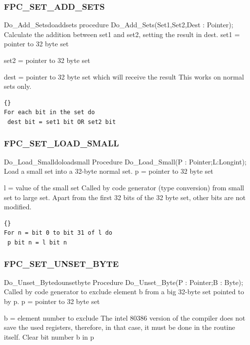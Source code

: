 \documentclass [a4paper,12pt]{article}
\begin{document}
\subsubsection{FPC{\_}SET{\_}ADD{\_}SETS}
\label{subsubsec:mylabel94}

\begin{procedurel}{Do{\_}Add{\_}Sets}{doaddsets}
\Declaration
procedure Do{\_}Add{\_}Sets(Set1,Set2,Dest : Pointer);
\Description
Calculate the addition between \textsf{set1} and \textsf{set2}, setting the
result in \textsf{dest}.
\Parameters
set1 = pointer to 32 byte set \par
set2 = pointer to 32 byte set \par
dest = pointer to 32 byte set which will receive the result
\Notes
This works on normal sets only.
\Algorithm
\begin{lstlisting}{}
For each bit in the set do
 dest bit = set1 bit OR set2 bit
\end{lstlisting}
\end{procedurel}

\subsubsection{FPC{\_}SET{\_}LOAD{\_}SMALL}
\label{subsubsec:mylabel95}

\begin{procedurel}{Do{\_}Load{\_}Small}{doloadsmall}
\Declaration
Procedure Do{\_}Load{\_}Small(P : Pointer;L:Longint);
\Description
Load a small set into a 32-byte normal set.
\Parameters
p = pointer to 32 byte set \par
l = value of the small set
\Notes
Called by code generator (type conversion) from small set to large set.
Apart from the first 32 bits of the 32 byte set, other bits are not
modified.
\Algorithm
\begin{lstlisting}{}
For n = bit 0 to bit 31 of l do
 p bit n = l bit n
\end{lstlisting}
\end{procedurel}

\subsubsection{FPC{\_}SET{\_}UNSET{\_}BYTE}
\label{subsubsec:mylabel96}

\begin{procedurel}{Do{\_}Unset{\_}Byte}{dounsetbyte}
\Declaration
Procedure Do{\_}Unset{\_}Byte(P : Pointer;B : Byte);
\Description
Called by code generator to exclude element b from a big 32-byte set pointed
to by p.
\Parameters
p = pointer to 32 byte set \par b = element number to exclude
\Notes
The intel 80386 version of the compiler does not save the used registers,
therefore, in that case, it must be done in the routine itself.
\Algorithm
Clear bit number b in p
\end{procedurel}
\end{document}
